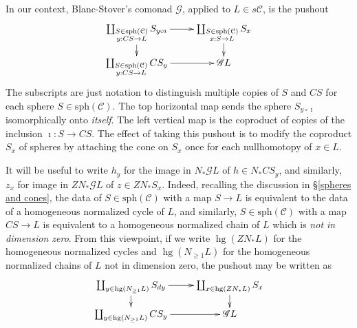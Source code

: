 \documentclass[11pt]{amsart} \renewcommand{\baselinestretch}{1.2}
\theoremstyle{plain}
\theoremstyle{definition}
\DeclareMathOperator{\homog}{hg}
\renewcommand{\to}{\longrightarrow}
\newcommand{\scrG}{\mathscr{G}}
\newcommand{\calc}{\mathcal{C}}
\newcommand{\spheres}[1]{\mathrm{sph}(#1)}
\newcommand{\BSW}{{\scrG}}
\begin{document}
\begin{Composite functor spectral sequences}
In our context, Blanc-Stover's comonad $\BSW$, applied to $L\in s\calc$, is the pushout
\[\xymatrix@R=4mm{
\coprod_{\substack{S\in\spheres{\calc}\\y:CS\rightarrow L}}S_{ y\circ\imath}
\ar[r]\ar[d]%
&%
\coprod_{\substack{S\in\spheres{\calc}\\x:S\rightarrow L}}S_{ x}\ar[d]\\%
\coprod_{\substack{S\in\spheres{\calc}\\y:CS\rightarrow L}}CS_{ y}
\ar[r]&%
\BSW L%
}\]
The subscripts are just notation to distinguish multiple copies of $S$ and $CS$ for each sphere $S\in\spheres{\calc}$.
The top horizontal map sends the sphere $S_{ y\circ\imath}$ isomorphically onto \emph{itself}. The left vertical map is the coproduct of copies of the inclusion $\imath:S\to CS$. The effect of taking this pushout is to modify the coproduct $S_{ x}$ of spheres by attaching the  cone on $S_{ x}$  once for each nullhomotopy of $x\in L$.

It will be useful to write $h_y$ for the image in $N_*\BSW L$ of $h\in N_*CS_{ y}$, and similarly, $z_x$ for image in $ZN_*\BSW L$ of $z\in ZN_*S_{ x}$. Indeed, recalling the discussion in \S\ref{spheres and cones}, the data of $S\in\spheres{\calc}$ with a map $S\to L$ is equivalent to the data of a homogeneous normalized cycle of $L$, and similarly, $S\in\spheres{\calc}$ with a map $CS\to L$ is equivalent to a homogeneous normalized chain of $L$ which is \emph{not in dimension zero}. From this viewpoint, if we write $\homog (ZN_*L)$ for the homogeneous normalized cycles and $\homog (N_{\geq1}L)$ for the homogeneous normalized chains of $L$ not in dimension zero, the pushout may be written as
\[\xymatrix@R=4mm{
\coprod_{y\in \homog (N_{\geq1}L)}S_{ dy}
\ar[r]\ar[d]%
&%
\coprod_{x\in \homog (ZN_*L)}S_{ x}\ar[d]\\%
\coprod_{y\in \homog (N_{\geq1}L)}CS_{ y}
\ar[r]&%
\BSW L%
}\]




\end{Composite functor spectral sequences}
\end{document}
